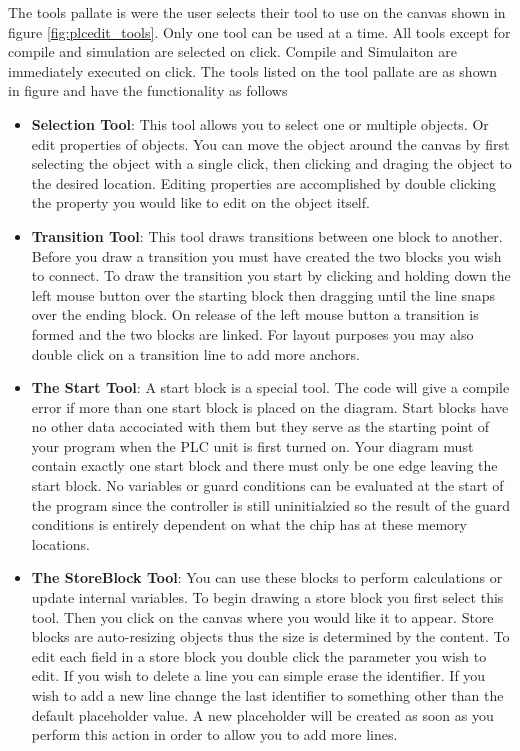 The tools pallate is were the user selects their tool to use on the canvas shown in figure \ref{fig:plcedit_tools}. Only one tool can be used at a time. All tools except for compile and simulation are selected on click. Compile and Simulaiton are immediately executed on click.
The tools listed on the tool pallate are as shown in figure %
and have the functionality as follows
\begin{itemize}
\item \textbf{Selection Tool}: This tool allows you to select one or multiple objects. Or edit properties of objects. You can move the object around the canvas by first selecting the object with a single click, then clicking and draging the object to the desired location. Editing properties are accomplished by double clicking the property you would like to edit on the object itself.
\item \textbf{Transition Tool}: This tool draws transitions between one block to another. Before you draw a transition you must have created the two blocks you wish to connect. To draw the transition you start by clicking and holding down the left mouse button over the starting block then dragging until the line snaps over the ending block. On release of the left mouse button a transition is formed and the two blocks are linked. For layout purposes you may also double click on a transition  line to add more anchors.
\item \textbf{The Start Tool}: A start block is a special tool. The code will give a compile error if more than one start block is placed on the diagram. Start blocks have no other data accociated with them but they serve as the starting point of your program when the PLC unit is first turned on. Your diagram must contain exactly one start block and there must only be one edge leaving the start block. No variables or guard conditions can be evaluated at the start of the program since the controller is still uninitialzied so the result of the guard conditions is entirely dependent on what the chip has at these memory locations.
\item \textbf{The StoreBlock Tool}: You can use these blocks to perform calculations or update internal variables. To begin drawing a store block you first select this tool. Then you click on the canvas where you would like it to appear. Store blocks are auto-resizing objects thus the size is determined by the content. To edit each field in a store block you double click the parameter you wish to edit. If you wish to delete a line you can simple erase the identifier. If you wish to add a new line change the last identifier to something other than the default placeholder value. A new placeholder will be created as soon as you perform this action in order to allow you to add more lines.

\end{itemize}
